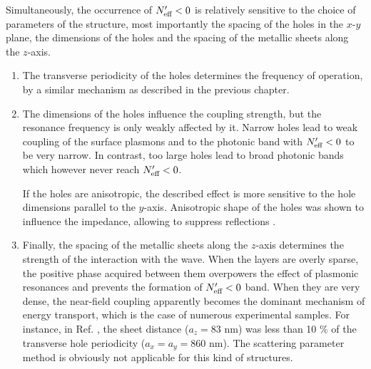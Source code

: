 Simultaneously,  the occurrence of $N_{\text{eff} }'<0$ is relatively sensitive to the choice of parameters of the structure, most importantly the spacing of the holes in the $x$-$y$ plane, the dimensions of the holes and the spacing of the metallic sheets along the $z$-axis.
\begin{enumerate}
\item{The transverse periodicity of the holes determines the frequency of operation, by a similar mechanism as described in the previous chapter.} 
\item{The dimensions of the holes influence the coupling strength, but the resonance frequency is only weakly affected by it. Narrow holes lead to weak coupling of the surface plasmons and to the photonic band with $N_{\text{eff} }'<0$ to be very narrow. In contrast, too large holes lead to broad photonic bands which however never reach $N_{\text{eff} }'<0$. 
	
If the holes are anisotropic, the described effect is more sensitive to the hole dimensions parallel to the $y$-axis. Anisotropic shape of the holes  was shown to influence the impedance, allowing to suppress reflections \cite{croenne2009left}.} 
\item{Finally, the spacing of the metallic sheets along the $z$-axis determines the strength of the interaction with the wave. When the layers are overly sparse, the positive phase acquired between them overpowers the effect of plasmonic resonances and prevents the formation of $N_{\text{eff} }'< 0$ band. When they are very dense, the near-field coupling apparently becomes the dominant mechanism of energy transport, which is the case of numerous experimental samples. For instance, in Ref. \cite{valentine2011development}, the sheet distance ($a_z = 83$ nm) was less than 10 \% of the transverse hole periodicity ($a_x = a_y = 860$ nm). The scattering parameter method is obviously not applicable for this kind of structures.}
\end{enumerate}


